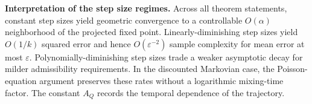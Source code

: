 \documentclass{article}
\begin{document}
\noindent\textbf{Interpretation of the step size regimes.}
Across all theorem statements, constant step sizes yield geometric convergence to a controllable $O(\alpha)$ neighborhood of the projected fixed point. Linearly-diminishing step sizes yield $O(1/k)$ squared error and hence $O(\varepsilon^{-2})$ sample complexity for mean error at most $\varepsilon$. Polynomially-diminishing step sizes trade a weaker asymptotic decay for milder admissibility requirements. In the discounted Markovian case, the Poisson-equation argument preserves these rates without a logarithmic mixing-time factor. The constant $A_Q$ records the temporal dependence of the trajectory.
\end{document}
